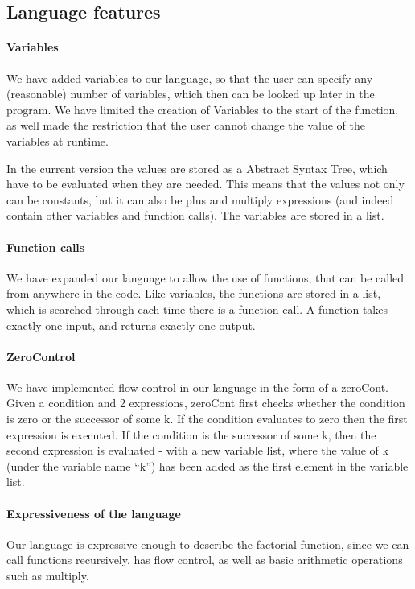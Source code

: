 \subsection{Language features}

\paragraph{Variables}
We have added variables to our language, so that the user can specify
any (reasonable) number of variables, which then can be looked up
later in the program. We have limited the creation of Variables to the
start of the function, as well made the restriction that the user
cannot change the value of the variables at runtime.

In the current version the values are stored as a Abstract Syntax
Tree, which have to be evaluated when they are needed. This means that
the values not only can be constants, but it can also be plus and
multiply expressions (and indeed contain other variables and function
calls). The variables are stored in a list.

\paragraph{Function calls}

We have expanded our language to allow the use of functions, that can
be called from anywhere in the code. Like variables, the functions are
stored in a list, which is searched through each time there is a
function call. A function takes exactly one input, and returns exactly
one output.

\paragraph{ZeroControl}
We have implemented flow control in our language in the form of a
zeroCont. Given a condition and 2 expressions, zeroCont first checks
whether the condition is zero or the successor of some k. If the
condition evaluates to zero then the first expression is executed. If
the condition is the successor of some k, then the second expression
is evaluated - with a new variable list, where the value of k (under
the variable name ``k'') has been added as the first element in the
variable list.

\paragraph{Expressiveness of the language}
Our language is expressive enough to describe the factorial function,
since we can call functions recursively, has flow control, as well as
basic arithmetic operations such as multiply.

